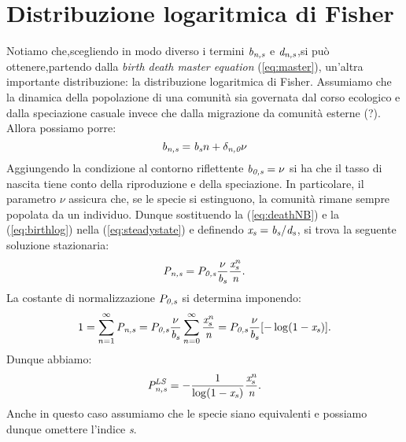\section{Distribuzione logaritmica di Fisher}
Notiamo che,scegliendo in modo diverso i termini $\emph{b}_\emph{n,s}$ e $\emph{d}_\emph{n,s}$,si può ottenere,partendo dalla \emph{birth death master equation} (\ref{eq:master}), un'altra importante distribuzione: la distribuzione logaritmica di Fisher.
Assumiamo che la dinamica della popolazione di una comunità sia governata dal corso ecologico e dalla speciazione casuale invece che dalla migrazione da comunità esterne (?).
Allora possiamo porre:
\begin{equation}
    \emph{b}_\emph{n,s}=\emph{b}_\emph{s}n+\delta_\emph{n,0}\nu
\label{eq:birthlog}
\end{equation}
Aggiungendo la condizione al contorno riflettente $\emph{b}_\emph{0,s}=\nu$ si ha che il tasso di nascita tiene conto della riproduzione e della speciazione. In particolare, il parametro $\nu$ assicura che, se le specie si estinguono, la comunità rimane sempre popolata da un individuo.
Dunque sostituendo la (\ref{eq:deathNB}) e la (\ref{eq:birthlog}) nella (\ref{eq:steadystate}) e definendo $\emph{x}_\emph{s}=\emph{b}_\emph{s}/\emph{d}_\emph{s}$, si trova la seguente soluzione stazionaria:
\begin{equation}
    \emph{P}_\emph{n,s}=P_\emph{0,s}\frac{\nu}{\emph{b}_\emph{s}}\frac{\emph{x}_\emph{s}^{\emph{n}}}{\emph{n}}.
\end{equation}
La costante di normalizzazione $P_\emph{0,s}$ si determina imponendo:
$$
1=\sum_{n=1}^\infty \emph{P}_{\emph{n,s}}=P_\emph{0,s}\frac{\nu}{\emph{b}_\emph{s}}\sum_{n=0}^\infty\frac{\emph{x}_\emph{s}^{\emph{n}}}{\emph{n}}=P_\emph{0,s}\frac{\nu}{\emph{b}_\emph{s}}[-\log(1-\emph{x}_\emph{s})].
$$
Dunque abbiamo:
\begin{equation}
    \emph{P}_\emph{n,s}^{\emph{LS}}=-\frac{1}{\log(1-\emph{x}_\emph{s})}\frac{\emph{x}_\emph{s}^{\emph{n}}}{\emph{n}}.
\label{eq:fisherdist}
\end{equation}
Anche in questo caso assumiamo che le specie siano equivalenti e possiamo dunque omettere l'indice \emph{s}.

